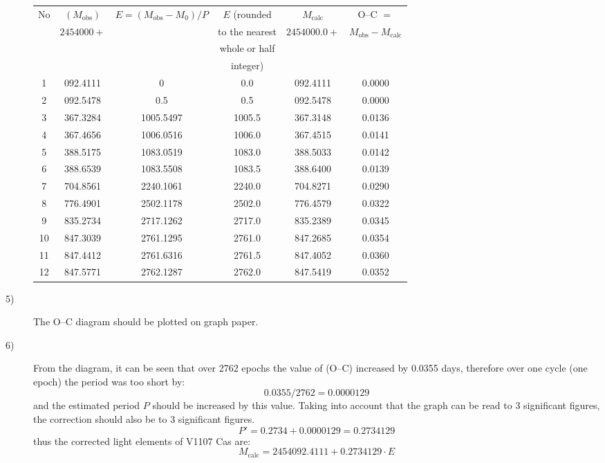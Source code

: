 \begin{description}
  \begin{center}
  \begin{tabular}{cccccc}
    \hline
    No & $(M_{\mathrm{obs}})$ & $E = (M_{\mathrm{obs}} - M_0)/P$
       & $E$ (rounded & $M_{\mathrm{calc}}$
       & O--C $=$ \\
       & $2454000+$ & & to the nearest & $2454000.0+$
       & $M_{\mathrm{obs}} - M_{\mathrm{calc}}$ \\
       & & & whole or half & & \\
       & & & integer) & & \\
    \hline
    1  & 092.4111 & 0         & 0.0    & 092.4111 & 0.0000 \\
    2  & 092.5478 & 0.5       & 0.5    & 092.5478 & 0.0000 \\
    3  & 367.3284 & 1005.5497 & 1005.5 & 367.3148 & 0.0136 \\
    4  & 367.4656 & 1006.0516 & 1006.0 & 367.4515 & 0.0141 \\
    5  & 388.5175 & 1083.0519 & 1083.0 & 388.5033 & 0.0142 \\
    6  & 388.6539 & 1083.5508 & 1083.5 & 388.6400 & 0.0139 \\
    7  & 704.8561 & 2240.1061 & 2240.0 & 704.8271 & 0.0290 \\
    8  & 776.4901 & 2502.1178 & 2502.0 & 776.4579 & 0.0322 \\
    9  & 835.2734 & 2717.1262 & 2717.0 & 835.2389 & 0.0345 \\
    10 & 847.3039 & 2761.1295 & 2761.0 & 847.2685 & 0.0354 \\
    11 & 847.4412 & 2761.6316 & 2761.5 & 847.4052 & 0.0360 \\
    12 & 847.5771 & 2762.1287 & 2762.0 & 847.5419 & 0.0352 \\
    \hline
  \end{tabular}
  \end{center}

\item[5)] The O--C diagram should be plotted on graph paper.

\item[6)] From the diagram, it can be seen that over 2762 epochs the value of
  (O--C) increased by 0.0355 days, therefore over one cycle (one epoch) the
  period was too short by:
  \[ 0.0355/2762 = 0.0000129 \]
  and the estimated period $P$ should be increased by this value. Taking into
  account that the graph can be read to 3 significant figures, the correction
  should also be to 3 significant figures.
  \[ P' = 0.2734 + 0.0000129 = 0.2734129 \]
  thus the corrected light elements of V1107 Cas are:
  \[ M_{\mathrm{calc}} = 2454092.4111 + 0.2734129 \cdot E \]


\end{description}
